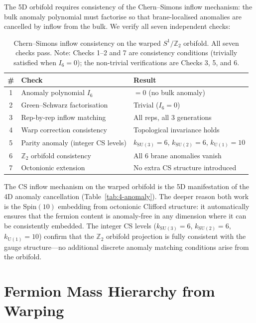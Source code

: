 The 5D orbifold requires consistency of the Chern--Simons inflow mechanism: the bulk anomaly polynomial must factorise so that brane-localised anomalies are cancelled by inflow from the bulk.  We verify all seven independent checks:

\begin{table}[htbp]
\centering
\caption{Chern--Simons inflow consistency on the warped $S^1/\mathbb{Z}_2$ orbifold.  All seven checks pass.  Note: Checks 1--2 and 7 are consistency conditions (trivially satisfied when $I_6 = 0$); the non-trivial verifications are Checks 3, 5, and 6.}
\label{tab:4-cs-inflow}
\small
\begin{tabular}{@{}cll@{}}
\toprule
\# & Check & Result \\
\midrule
1 & Anomaly polynomial $I_6$ & $= 0$ (no bulk anomaly) \\
2 & Green--Schwarz factorisation & Trivial ($I_6 = 0$) \\
3 & Rep-by-rep inflow matching & All reps, all 3 generations \\
4 & Warp correction consistency & Topological invariance holds \\
5 & Parity anomaly (integer CS levels) & $k_{\mathrm{SU}(3)} = 6$, $k_{\mathrm{SU}(2)} = 6$, $k_{\mathrm{U}(1)} = 10$ \\
6 & $\mathbb{Z}_2$ orbifold consistency & All 6 brane anomalies vanish \\
7 & Octonionic extension & No extra CS structure introduced \\
\bottomrule
\end{tabular}
\end{table}

The CS inflow mechanism on the warped orbifold is the 5D manifestation of the 4D anomaly cancellation (Table~\ref{tab:4-anomaly}).  The deeper reason both work is the $\mathrm{Spin}(10)$ embedding from octonionic Clifford structure: it automatically ensures that the fermion content is anomaly-free in any dimension where it can be consistently embedded.  The integer CS levels ($k_{\mathrm{SU}(3)} = 6$, $k_{\mathrm{SU}(2)} = 6$, $k_{\mathrm{U}(1)} = 10$) confirm that the $\mathbb{Z}_2$ orbifold projection is fully consistent with the gauge structure---no additional discrete anomaly matching conditions arise from the orbifold.


\section{Fermion Mass Hierarchy from Warping}
\label{sec:4-fermion-mass}

